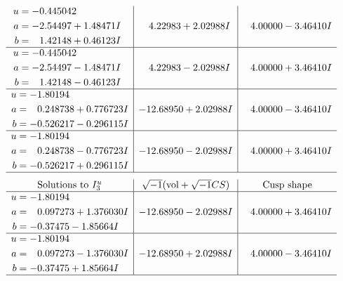 \documentclass[1p]{elsarticle_modified}
\theoremstyle{definition}
\newcommand{\I}{\sqrt{-1}}
\begin{document}
$$\begin{array}{c|c|c}
\begin{aligned}
u &= -0.445042\phantom{ +0.000000I} \\
a &= -2.54497 + 1.48471 I \\
b &= \phantom{-}1.42148 + 0.46123 I\end{aligned}
 & \phantom{-}4.22983 + 2.02988 I & \phantom{-}4.00000 - 3.46410 I \\ \hline\begin{aligned}
u &= -0.445042\phantom{ +0.000000I} \\
a &= -2.54497 - 1.48471 I \\
b &= \phantom{-}1.42148 - 0.46123 I\end{aligned}
 & \phantom{-}4.22983 - 2.02988 I & \phantom{-}4.00000 + 3.46410 I \\ \hline\begin{aligned}
u &= -1.80194\phantom{ +0.000000I} \\
a &= \phantom{-}0.248738 + 0.776723 I \\
b &= -0.526217 - 0.296115 I\end{aligned}
 & -12.68950 + 2.02988 I & \phantom{-}4.00000 - 3.46410 I \\ \hline\begin{aligned}
u &= -1.80194\phantom{ +0.000000I} \\
a &= \phantom{-}0.248738 - 0.776723 I \\
b &= -0.526217 + 0.296115 I\end{aligned}
 & -12.68950 - 2.02988 I & \phantom{-}4.00000 + 3.46410 I\\
 \hline 
 \end{array}$$\newpage$$\begin{array}{c|c|c}  
\text{Solutions to }I^u_{3}& \I (\text{vol} + \sqrt{-1}CS) & \text{Cusp shape}\\
 \hline 
\begin{aligned}
u &= -1.80194\phantom{ +0.000000I} \\
a &= \phantom{-}0.097273 + 1.376030 I \\
b &= -0.37475 - 1.85664 I\end{aligned}
 & -12.68950 - 2.02988 I & \phantom{-}4.00000 + 3.46410 I \\ \hline\begin{aligned}
u &= -1.80194\phantom{ +0.000000I} \\
a &= \phantom{-}0.097273 - 1.376030 I \\
b &= -0.37475 + 1.85664 I\end{aligned}
 & -12.68950 + 2.02988 I & \phantom{-}4.00000 - 3.46410 I\\
 \hline 
 \end{array}$$\newpage
\end{document}
